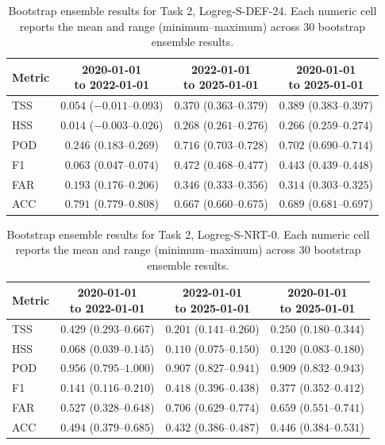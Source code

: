 \begin{table}[htbp]
\centering
\small
\caption{Bootstrap ensemble results for Task 2, Logreg-S-DEF-24. Each numeric cell reports the mean and range (minimum--maximum) across 30 bootstrap ensemble results.}
\label{tab:app-task2-logreg-s-def-24}
\begin{tabular}{lccc}
\toprule
Metric & \shortstack{2020-01-01\\to 2022-01-01} & \shortstack{2022-01-01\\to 2025-01-01} & \shortstack{2020-01-01\\to 2025-01-01} \\
\midrule
TSS & $0.054$ ($-0.011$--$0.093$) & $0.370$ ($0.363$--$0.379$) & $0.389$ ($0.383$--$0.397$) \\
HSS & $0.014$ ($-0.003$--$0.026$) & $0.268$ ($0.261$--$0.276$) & $0.266$ ($0.259$--$0.274$) \\
POD & $0.246$ ($0.183$--$0.269$) & $0.716$ ($0.703$--$0.728$) & $0.702$ ($0.690$--$0.714$) \\
F1 & $0.063$ ($0.047$--$0.074$) & $0.472$ ($0.468$--$0.477$) & $0.443$ ($0.439$--$0.448$) \\
FAR & $0.193$ ($0.176$--$0.206$) & $0.346$ ($0.333$--$0.356$) & $0.314$ ($0.303$--$0.325$) \\
ACC & $0.791$ ($0.779$--$0.808$) & $0.667$ ($0.660$--$0.675$) & $0.689$ ($0.681$--$0.697$) \\
\bottomrule
\end{tabular}
\end{table}
\clearpage

\begin{table}[htbp]
\centering
\small
\caption{Bootstrap ensemble results for Task 2, Logreg-S-NRT-0. Each numeric cell reports the mean and range (minimum--maximum) across 30 bootstrap ensemble results.}
\label{tab:app-task2-logreg-s-nrt-0}
\begin{tabular}{lccc}
\toprule
Metric & \shortstack{2020-01-01\\to 2022-01-01} & \shortstack{2022-01-01\\to 2025-01-01} & \shortstack{2020-01-01\\to 2025-01-01} \\
\midrule
TSS & $0.429$ ($0.293$--$0.667$) & $0.201$ ($0.141$--$0.260$) & $0.250$ ($0.180$--$0.344$) \\
HSS & $0.068$ ($0.039$--$0.145$) & $0.110$ ($0.075$--$0.150$) & $0.120$ ($0.083$--$0.180$) \\
POD & $0.956$ ($0.795$--$1.000$) & $0.907$ ($0.827$--$0.941$) & $0.909$ ($0.832$--$0.943$) \\
F1 & $0.141$ ($0.116$--$0.210$) & $0.418$ ($0.396$--$0.438$) & $0.377$ ($0.352$--$0.412$) \\
FAR & $0.527$ ($0.328$--$0.648$) & $0.706$ ($0.629$--$0.774$) & $0.659$ ($0.551$--$0.741$) \\
ACC & $0.494$ ($0.379$--$0.685$) & $0.432$ ($0.386$--$0.487$) & $0.446$ ($0.384$--$0.531$) \\
\bottomrule
\end{tabular}
\end{table}
\clearpage

